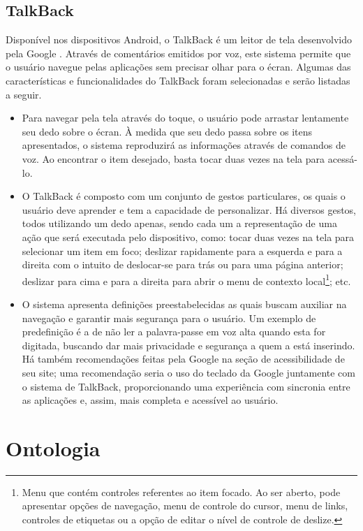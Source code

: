 \subsection{TalkBack}

Disponível nos dispositivos Android, o TalkBack é um leitor de tela desenvolvido pela Google \cite{TALKB2016}. Através de comentários emitidos por voz, este sistema permite que o usuário navegue pelas aplicações sem precisar olhar para o écran. Algumas das características e funcionalidades do TalkBack foram selecionadas e serão listadas a seguir.
\begin{itemize}
	\item Para navegar pela tela através do toque, o usuário pode arrastar lentamente seu dedo sobre o écran. À medida que seu dedo passa sobre os itens apresentados, o sistema reproduzirá as informações através de comandos de voz. Ao encontrar o item desejado, basta tocar duas vezes na tela para acessá-lo.
	\item O TalkBack é composto com um conjunto de gestos particulares, os quais o usuário deve aprender e tem a capacidade de personalizar. Há diversos gestos, todos utilizando um dedo apenas, sendo cada um a representação de uma ação que será executada pelo dispositivo, como: tocar duas vezes na tela para selecionar um item em foco; deslizar rapidamente para a esquerda e para a direita com o intuito de deslocar-se para trás ou para uma página anterior; deslizar para cima e para a direita para abrir o menu de contexto local\footnote{Menu que contém controles referentes ao item focado. Ao ser aberto, pode apresentar opções de navegação, menu de controle do cursor, menu de links, controles de etiquetas ou a opção de editar o nível de controle de deslize.}; etc.
	\item O sistema apresenta definições preestabelecidas as quais buscam auxiliar na navegação e garantir mais segurança para o usuário. Um exemplo de predefinição é a de não ler a palavra-passe em voz alta quando esta for digitada, buscando dar mais privacidade e segurança a quem a está inserindo. Há também recomendações feitas pela Google na seção de acessibilidade de seu site; uma recomendação seria o uso do teclado da Google juntamente com o sistema de TalkBack, proporcionando uma experiência com sincronia entre as aplicações e, assim, mais completa e acessível ao usuário.
\end{itemize}

\section{Ontologia}

